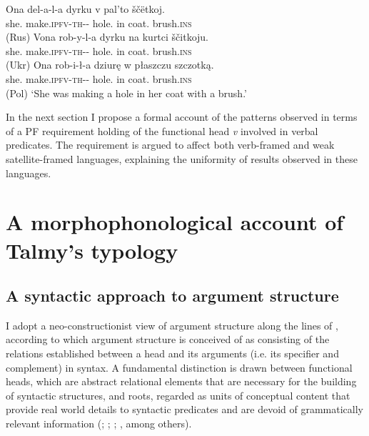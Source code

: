 \documentclass[output=paper,colorlinks,citecolor=brown]{langscibook}
\begin{document}
\ea \label{overtlightverb} \ea \gll Ona del-a-l-a dyrku v pal'to \v{s}\v{c}ëtkoj.\\
she.{\NOM} make.\textsc{ipfv}-\textsc{th}-{\PST-\AGR} hole.{\ACC} in coat.{\LOC} brush.\textsc{ins} \label{Rubrush2}\\ \hfill (Rus)%
\ex \gll Vona rob-y-l-a dyrku na kurtci \v{s}\v{c}itkoju.\\
she.{\NOM} make.\textsc{ipfv}-\textsc{th}-{\PST-\AGR} hole.{\ACC} in coat.{\LOC} brush.\textsc{ins} \label{Ukbrush2}\\ \hfill (Ukr)%
\ex \gll Ona rob-i-ł-a dziurę w płaszczu szczotką.\\
she.{\NOM} make.\textsc{ipfv}-\textsc{th}-{\PST-\AGR} hole.{\ACC} in coat.{\LOC} brush.\textsc{ins}\label{Pobrush2}\\ \hfill (Pol)%
\z
\glt `She was making a hole in her coat with a brush.'
\z

\noindent In the next section %
I propose a formal account of the patterns observed in terms of a PF requirement holding of the functional head \textit{v} involved in verbal predicates. The requirement is argued to affect both verb-framed and weak satellite-framed languages, explaining the uniformity of results observed in these languages.

\section{A morphophonological account of Talmy's typology}\label{3}

\subsection{A syntactic approach to argument structure}\label{3.1}

I adopt a neo-constructionist view of argument structure along the lines of \citet{MateuAndAcedo-Matellan2012}, according to which argument structure is conceived of as consisting of the relations established between a head and its arguments (i.e. its specifier and complement) in syntax. A fundamental distinction is drawn between functional heads, which are abstract relational elements that are necessary for the building of syntactic structures, and roots, regarded as units of conceptual content that provide real world details to syntactic predicates and are devoid of grammatically relevant information (\citealt{Mateu2002}; \citealt{Borer2005b}; \citealt{Acedo-Matellan2010}; \citeyear{Acedo-Matellan2016}, among others).
\end{document}
